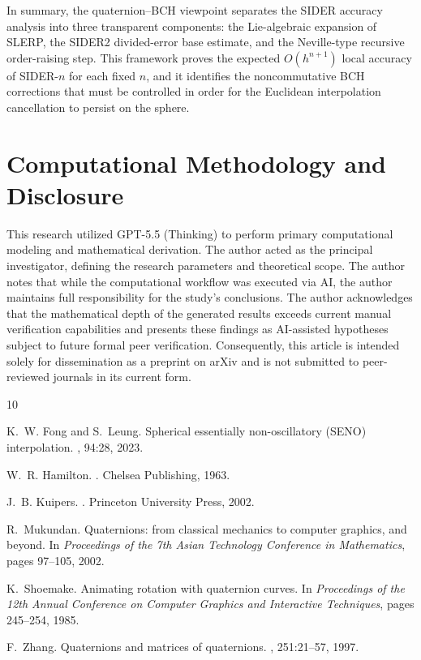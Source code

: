 \documentclass[a4paper,11pt]{article}
\numberwithin{equation}{section}
\theoremstyle{plain}
\theoremstyle{definition}
\theoremstyle{remark}
\begin{document}
In summary, the quaternion--BCH viewpoint separates the SIDER accuracy
analysis into three transparent components: the Lie-algebraic expansion of
SLERP, the SIDER2 divided-error base estimate, and the Neville-type recursive
order-raising step.  This framework proves the expected \(O(h^{n+1})\) local
accuracy of SIDER-\(n\) for each fixed \(n\), and it identifies the
noncommutative BCH corrections that must be controlled in order for the
Euclidean interpolation cancellation to persist on the sphere.

\section*{Computational Methodology and Disclosure}

This research utilized GPT-5.5 (Thinking) to perform primary computational modeling and mathematical derivation. The author acted as the principal investigator, defining the research parameters and theoretical scope. The author notes that while the computational workflow was executed via AI, the author maintains full responsibility for the study's conclusions. The author acknowledges that the mathematical depth of the generated results exceeds current manual verification capabilities and presents these findings as AI-assisted hypotheses subject to future formal peer verification. Consequently, this article is intended solely for dissemination as a preprint on arXiv and is not submitted to peer-reviewed journals in its current form.


\begin{thebibliography}{10}

K.~W. Fong and S.~Leung.
\newblock Spherical essentially non-oscillatory (SENO) interpolation.
, 94:28, 2023.

W.~R. Hamilton.
.
\newblock Chelsea Publishing, 1963.

J.~B. Kuipers.
.
\newblock Princeton University Press, 2002.

R.~Mukundan.
\newblock Quaternions: from classical mechanics to computer graphics, and
beyond.
\newblock In {\em Proceedings of the 7th Asian Technology Conference in
Mathematics}, pages 97--105, 2002.

K.~Shoemake.
\newblock Animating rotation with quaternion curves.
\newblock In {\em Proceedings of the 12th Annual Conference on Computer
Graphics and Interactive Techniques}, pages 245--254, 1985.

F.~Zhang.
\newblock Quaternions and matrices of quaternions.
, 251:21--57, 1997.

\end{thebibliography}
\end{document}
